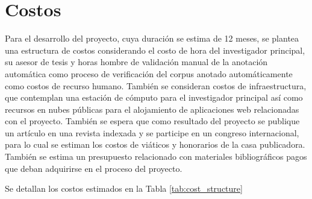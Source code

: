 \chapter{Costos}

Para el desarrollo del proyecto, cuya duración se estima de 12 meses, se plantea una estructura de costos considerando el costo de hora del investigador principal, su asesor de tesis y horas hombre de validación manual de la anotación automática como proceso de verificación del corpus anotado automáticamente como costos de recurso humano. También se consideran costos de infraestructura, que contemplan una estación de cómputo para el investigador principal así como recursos en nubes públicas para el alojamiento de aplicaciones web relacionadas con el proyecto. También se espera que como resultado del proyecto se publique un artículo en una revista indexada y se participe en un congreso internacional, para lo cual se estiman los costos de viáticos y honorarios de la casa publicadora. También se estima un presupuesto relacionado con materiales bibliográficos pagos que deban adquirirse en el proceso del proyecto. 

Se detallan los costos estimados en la Tabla \ref{tab:cost_structure}


